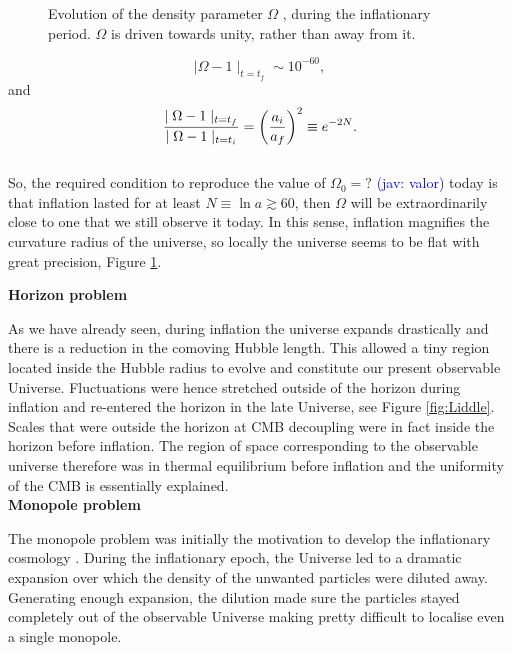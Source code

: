 \documentclass{rmaa}
\def\beq{\begin{equation}}
\def\eeq{\end{equation}}
\newcommand{\jav}[1]{\textcolor{blue}{(jav: #1)}}
\begin{document}
\begin{figure}[t!] 
\centerline{ \epsfxsize=200pt  }
\caption{Evolution of the density parameter $\Omega$ , during the inflationary period. $\Omega$ is
driven towards unity, rather than away from it.}%
\label{fig:curvature}
\end{figure}

$$
\mid \Omega -1\mid_{t=t_f}\sim10^{-60},
$$
and
\beq
\frac{\mid \Omega -1\mid_{t=t_f}}{\mid \Omega -1\mid_{t=t_i}}= \left( a_i \over a_f \right)^2\equiv e^{-2N}.
\eeq
\\

So, the required condition to reproduce the value of $\Omega_0=?$ \jav{valor} today is 
that inflation lasted for at least $N\equiv\ln a \gtrsim 60 $, then $\Omega$ will be
extraordinarily close to one that we still observe it today.
In this sense, inflation magnifies the curvature radius of the universe, so 
locally the universe seems to be flat with great precision, Figure \ref{fig:curvature}.



\vskip 16pt
\noindent
\textbf{Horizon problem}
\vskip 6pt


As we have already seen, during inflation the universe expands drastically and there is a 
reduction in the comoving Hubble length. This allowed a tiny region located inside the 
Hubble radius to evolve and constitute our present observable Universe. 
Fluctuations were hence stretched outside of the horizon during inflation and re-entered the horizon 
in the late Universe, see Figure \ref{fig:Liddle}. Scales that were outside the horizon at CMB decoupling 
were in fact inside the horizon before inflation. The region of space corresponding to the 
observable universe therefore was in thermal equilibrium before inflation and the uniformity 
of the CMB is essentially explained.
\\


\vskip 16pt
\noindent
\textbf{Monopole problem}
\vskip 6pt

The monopole problem was initially the motivation to develop the inflationary
cosmology \citep{Guth2}.
%
During the inflationary epoch, the Universe led to a dramatic expansion
over which the density of the unwanted particles were diluted away. Generating enough
expansion, the dilution made sure the particles stayed completely out of the observable Universe
making pretty difficult to localise even a single monopole.     
\end{document}
